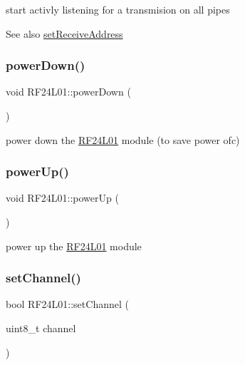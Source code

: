start activly listening for a transmision on all pipes \begin{DoxySeeAlso}{See also}
\mbox{\hyperlink{namespace_r_f24_l01_adcaf71ba2ff7a89bb25b727e29a3910e}{set\+Receive\+Address}} 
\end{DoxySeeAlso}
\mbox{\label{namespace_r_f24_l01_af818d0549c5506ee31b7807dd0ed8e79}} 
\subsubsection{\texorpdfstring{power\+Down()}{powerDown()}}
{\footnotesize\ttfamily void R\+F24\+L01\+::power\+Down (\begin{DoxyParamCaption}{ }\end{DoxyParamCaption})}

power down the \mbox{\hyperlink{namespace_r_f24_l01}{R\+F24\+L01}} module (to save power ofc) \mbox{\label{namespace_r_f24_l01_ac3b11b901e092083b61cc98724a504b6}} 
\subsubsection{\texorpdfstring{power\+Up()}{powerUp()}}
{\footnotesize\ttfamily void R\+F24\+L01\+::power\+Up (\begin{DoxyParamCaption}{ }\end{DoxyParamCaption})}

power up the \mbox{\hyperlink{namespace_r_f24_l01}{R\+F24\+L01}} module \mbox{\label{namespace_r_f24_l01_ab75f49984cfbb8815145f85c3b8c2385}} 
\subsubsection{\texorpdfstring{set\+Channel()}{setChannel()}}
{\footnotesize\ttfamily bool R\+F24\+L01\+::set\+Channel (\begin{DoxyParamCaption}\item[{uint8\+\_\+t}]{channel }\end{DoxyParamCaption})}

